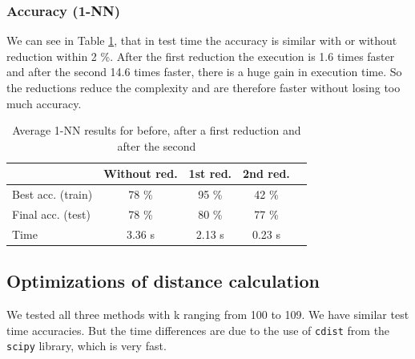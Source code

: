 \documentclass{article}
\theoremstyle{plain}
\theoremstyle{definition}
\theoremstyle{remark}
\begin{document}
\subsubsection{Accuracy (1-NN)}

We can see in Table \ref{reduction-results}, that in test time the accuracy is similar with or without reduction within 2 \%. After the first reduction the execution is 1.6 times faster and after the second 14.6 times faster, there is a huge gain in execution time. So the reductions reduce the complexity and are therefore faster without losing too much accuracy.

\vskip -0.3in
\begin{table}[ht]
\caption{Average 1-NN results for before, after a first reduction and after the second}
\label{reduction-results}
\begin{center}
\begin{small}
\begin{sc}
\vskip -0.2in
\begin{tabular}{lcccr}
\toprule
 & Without red. & 1st red. & 2nd red. \\
\midrule
Best acc. (train) & 78 \% & 95 \% & 42 \% \\
Final acc. (test) & 78 \% & 80 \% & 77 \% \\
Time              & 3.36 s & 2.13 s & 0.23 s \\ 
\bottomrule

\end{tabular}
\end{sc}
\end{small}
\end{center}
\vskip -0.3in
\end{table}

\subsection{Optimizations of distance calculation}

We tested all three methods with k ranging from 100 to 109. We have similar test time accuracies. But the time differences are due to the use of \verb|cdist| from the \verb|scipy| library, which is very fast.

\end{document}
